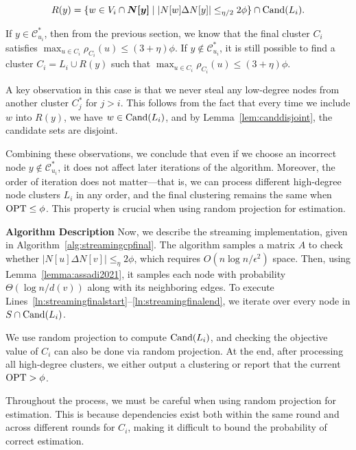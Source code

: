 \[
    R(y) = \{ w \in V_i \cap \bm{N[y]} \mid |N[w] \Delta N[y]|  \leq_{\eta/2} 2\phi \} \cap \mathrm{Cand}(L_i).
\]

If $y \in \mathcal{C}^*_{u_i}$, then from the previous section, we know that the final cluster $C_i$ satisfies $\max_{u \in C_i} \rho_{C_i}(u) \leq (3 + \eta) \phi$. If $y \not\in \mathcal{C}^*_{u_i}$, it is still possible to find a cluster $C_i = L_i \cup R(y)$ such that $\max_{u \in C_i} \rho_{C_i}(u) \leq (3 + \eta) \phi$. 

A key observation in this case is that we never steal any low-degree nodes from another cluster $C^*_j$ for $j > i$. This follows from the fact that every time we include $w$ into $R(y)$, we have $w \in \mathrm{Cand}(L_i)$, and by Lemma~\ref{lem:canddisjoint}, the candidate sets are disjoint. 

Combining these observations, we conclude that even if we choose an incorrect node $y \notin \mathcal{C}^*_{u_i}$, it does not affect later iterations of the algorithm. Moreover, the order of iteration does not matter—that is, we can process different high-degree node clusters $L_i$ in any order, and the final clustering remains the same when $\mathrm{OPT} \leq \phi$. This property is crucial when using random projection for estimation.


\textbf{Algorithm Description} Now, we describe the streaming implementation, given in Algorithm~\ref{alg:streamingcpfinal}. The algorithm samples a matrix $A$ to check whether $|N[u] \Delta N[v]| \leq_{\eta} 2\phi$, which requires $O(n\log n/\epsilon^2)$ space. Then, using Lemma~\ref{lemma:assadi2021}, it samples each node with probability $\Theta(\log n / d(v))$ along with its neighboring edges. To execute Lines~\ref{ln:streamingfinalstart}--\ref{ln:streamingfinalend}, we iterate over every node in $S \cap \mathrm{Cand}(L_i)$. 

We use random projection to compute $\mathrm{Cand}(L_i)$, and checking the objective value of $C_i$ can also be done via random projection. At the end, after processing all high-degree clusters, we either output a clustering or report that the current $\mathrm{OPT} > \phi$. 

Throughout the process, we must be careful when using random projection for estimation. This is because dependencies exist both within the same round and across different rounds for $C_i$, making it difficult to bound the probability of correct estimation.

